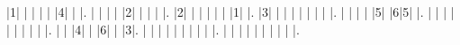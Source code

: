 \begin{sudoku-block}
|1| | | | | |4| | |.
| | | | |2| | | | |.
|2| | | | | | |1| |.
|3| | | | | | | | |.
| | | | |5| |6|5| |.
| | | | | | | | | |.
| | |4| | |6| | |3|.
| | | | | | | | | |.
| | | | | | | | | |.
\end{sudoku-block}